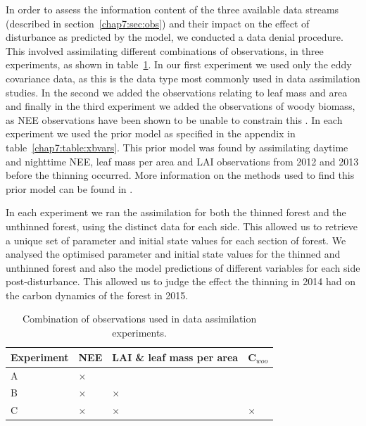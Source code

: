 In order to assess the information content of the three available data streams (described in section~\ref{chap7:sec:obs}) and their impact on the effect of disturbance as predicted by the model, we conducted a data denial procedure. This involved assimilating different combinations of observations, in three experiments, as shown in table~\ref{chap7:table:obs_da}. In our first experiment we used only the eddy covariance data, as this is the data type most commonly used in data assimilation studies. In the second we added the observations relating to leaf mass and area and finally in the third experiment we added the observations of woody biomass, as NEE observations have been shown to be unable to constrain this \citep{fox2009reflex}. In each experiment we used the prior model as specified in the appendix in table~\ref{chap7:table:xbvars}. This prior model was found by assimilating daytime and nighttime NEE, leaf mass per area and LAI observations from 2012 and 2013 before the thinning occurred. More information on the methods used to find this prior model can be found in \citet{Pinnington2016299}. 


In each experiment we ran the assimilation for both the thinned forest and the unthinned forest, using the distinct data for each side. This allowed us to retrieve a unique set of parameter and initial state values for each section of forest. We analysed the optimised parameter and initial state values for the thinned and unthinned forest and also the model predictions of different variables for each side post-disturbance. This allowed us to judge the effect the thinning in 2014 had on the carbon dynamics of the forest in 2015.

\begin{table}[ht] 
	\caption{Combination of observations used in data assimilation experiments.}
\begin{center}
	\begin{tabular}{| l | l | l | l |}
	\hline
	Experiment & NEE & LAI \& leaf mass per area & C\(_{woo}\) \\ \hline
	A & \(\times\) &  &  \\ \hline
	B & \(\times\) & \(\times\) &  \\ \hline
	C & \(\times\) & \(\times\) & \(\times\)  \\ \hline
	\end{tabular}
	\label{chap7:table:obs_da}
\end{center} 
\end{table}

